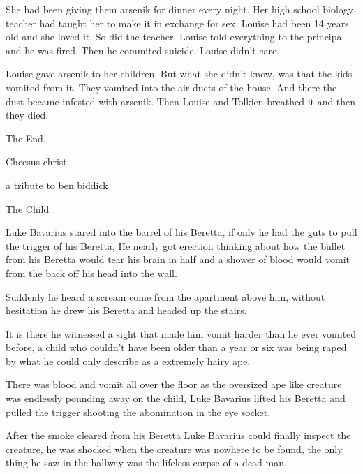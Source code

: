 She had been giving them arsenik for dinner every night. Her high
school biology teacher had taught her to make it in exchange for
sex. Louise had been 14 years old and she loved it. So did the
teacher. Louise told everything to the principal and he was fired.
Then he commited suicide. Louise didn't care.



Louise gave arsenik to her children. But what she didn't know, was
that the kids vomited from it. They vomited into the air ducts of
the house. And there the dust became infested with arsenik. Then
Louise and Tolkien breathed it and then they died.



The End. 
 





Cheesus christ. 
 





a tribute to ben biddick



The Child



Luke Bavarius stared into the barrel of his Beretta, if only he had
the guts to pull the trigger of his Beretta, He nearly got erection
thinking about how the bullet from his Beretta would tear his brain
in half and a shower of blood would vomit from the back off his
head into the wall.



Suddenly he heard a scream come from the apartment above him,
without hesitation he drew his Beretta and headed up the
stairs.



It is there he witnessed a sight that made him vomit harder than he
ever vomited before, a child who couldn't have been older
than a year or six was being raped by what he could only describe
as a extremely hairy ape.



There was blood and vomit all over the floor as the oversized ape
like creature was endlessly pounding away on the child, Luke
Bavarius lifted his Beretta and pulled the trigger shooting the
abomination in the eye socket.



After the smoke cleared from his Beretta Luke Bavarius could
finally inspect the creature, he was shocked when the creature was
nowhere to be found, the only thing he saw in the hallway was the
lifeless corpse of a dead man.



